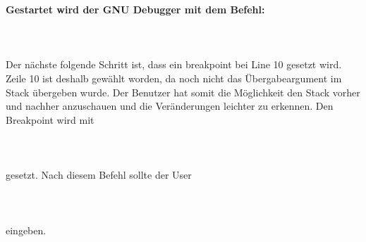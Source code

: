 \textbf{Gestartet wird der GNU Debugger mit dem Befehl:}\\\\
\\\\
Der nächste folgende Schritt ist, dass ein breakpoint bei Line 10 gesetzt wird. Zeile 10 ist deshalb gewählt worden, da noch nicht das Übergabeargument im Stack übergeben wurde. Der Benutzer hat somit die Möglichkeit den Stack vorher und nachher anzuschauen und die Veränderungen leichter zu erkennen. Den Breakpoint wird mit\\\\ \\\\ gesetzt. Nach diesem Befehl sollte der User\\\\ \\\\ eingeben. 
